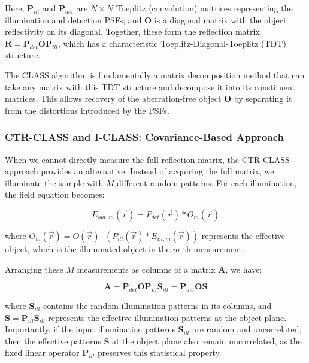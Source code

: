 \documentclass[12pt]{article}
\newenvironment{ourresponse}
    {\begin{tcolorbox}[width=\linewidth,breakable,enhanced,colback=gray!5,colframe=responsecolor!50,title=Response,left=5pt,right=5pt]}
    {\end{tcolorbox}}
\begin{document}
\begin{ourresponse}
Here, $\mathbf{P}_{ill}$ and $\mathbf{P}_{det}$ are $N \times N$ Toeplitz (convolution) matrices representing the illumination and detection PSFs, and $\mathbf{O}$ is a diagonal matrix with the object reflectivity on its diagonal. Together, these form the reflection matrix $\mathbf{R} = \mathbf{P}_{det} \mathbf{O} \mathbf{P}_{ill}$, which has a characteristic Toeplitz-Diagonal-Toeplitz (TDT) structure.

The CLASS algorithm is fundamentally a matrix decomposition method that can take any matrix with this TDT structure and decompose it into its constituent matrices. This allows recovery of the aberration-free object $\mathbf{O}$ by separating it from the distortions introduced by the PSFs.

\subsubsection*{CTR-CLASS and I-CLASS: Covariance-Based Approach}
When we cannot directly measure the full reflection matrix, the CTR-CLASS approach provides an alternative. Instead of acquiring the full matrix, we illuminate the sample with $M$ different random patterns. For each illumination, the field equation becomes:

\begin{equation}
E_{out,m}(\vec{r}) = P_{det}(\vec{r}) * O_m(\vec{r})
\end{equation}

where $O_m(\vec{r}) = O(\vec{r}) \cdot (P_{ill}(\vec{r}) * E_{in,m}(\vec{r}))$ represents the effective object, which is the illuminated object in the $m$-th measurement.

Arranging these $M$ measurements as columns of a matrix $\mathbf{A}$, we have:

\begin{equation}
\mathbf{A} = \mathbf{P}_{det} \mathbf{O} \mathbf{P}_{ill} \mathbf{S}_{ill} = \mathbf{P}_{det} \mathbf{O} \mathbf{S}
\end{equation}

where $\mathbf{S}_{ill}$ contains the random illumination patterns in its columns, and $\mathbf{S} = \mathbf{P}_{ill} \mathbf{S}_{ill}$ represents the effective illumination patterns at the object plane. Importantly, if the input illumination patterns $\mathbf{S}_{ill}$ are random and uncorrelated, then the effective patterns $\mathbf{S}$ at the object plane also remain uncorrelated, as the fixed linear operator $\mathbf{P}_{ill}$ preserves this statistical property.


\end{ourresponse}
\end{document}
